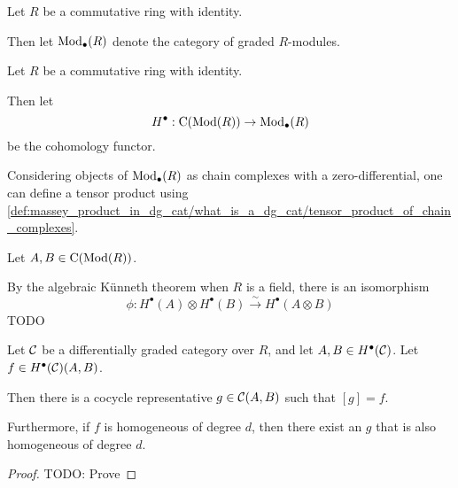 \begin{notation}
    Let \( R \) be a commutative ring with identity.

    Then let \( \operatorname{Mod}_{\bullet}(R) \) denote the category of graded \( R \)-modules.
\end{notation}

\begin{notation}
    Let \( R \) be a commutative ring with identity.

    Then let
    \[
        H^\bullet: \operatorname{C}(\operatorname{Mod}(R)) \to \operatorname{Mod}_{\bullet}(R)
    \]
    be the cohomology functor.
\end{notation}

\begin{fact}
    \label{fact:massey_product_in_dg_cat/massey_product_definition/algebraic_kunneth_isomorphism}
    Considering objects of \( \operatorname{Mod}_{\bullet}(R) \) as chain complexes with a zero-differential, one can define a tensor product using \autoref{def:massey_product_in_dg_cat/what_is_a_dg_cat/tensor_product_of_chain_complexes}.

    Let \( A, B \in \operatorname{C}(\operatorname{Mod}(R)) \).

    By the algebraic Künneth theorem when \( R \) is a field, there is an isomorphism
    \[
        \phi: H^\bullet(A) \otimes H^\bullet(B) \stackrel{\sim}{\to} H^\bullet(A \otimes B)
    \]
    TODO
\end{fact}

\begin{lemma}
    \label{lem:massey_product_in_dg_cat/massey_product_definition/exist_lifting_h_star}
    Let \( {\mathcal{C}} \) be a differentially graded category over \( R \), and let \( A, B \in H^\bullet({\mathcal{C}}) \). Let \( f \in H^\bullet({\mathcal{C}})(A, B) \).

    Then there is a cocycle representative \( g \in {\mathcal{C}}(A, B) \) such that \( [g] = f \).

    Furthermore, if \( f \) is homogeneous of degree \( d \), then there exist an \( g \) that is also homogeneous of degree \( d \).
\end{lemma}
\begin{proof}
    TODO: Prove
\end{proof}

